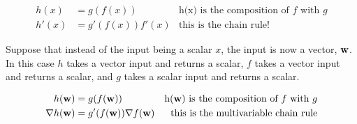 \documentclass[assignment04_Solutions]{subfiles}
\begin{document}
\begin{align}
h(x)&= g(f(x))&\mbox{h(x) is the composition of $f$ with $g$} \nonumber \\
h'(x) &= g'(f(x))f'(x)&\mbox{this is the chain rule!}
\end{align}

Suppose that instead of the input being a scalar $x$, the input is now a vector, $\mathbf{w}$.  In this case $h$ takes a vector input and returns a scalar, $f$ takes a vector input and returns a scalar, and $g$ takes a scalar input and returns a scalar.

\begin{align}
h(\mathbf{w}) &= g(f(\mathbf{w}))&\mbox{h($\mathbf{w}$) is the composition of $f$ with $g$} \nonumber \\
\nabla h(\mathbf{w}) &= g'(f(\mathbf{w})) \nabla f(\mathbf{w}) & \mbox{this is the multivariable chain rule}
\end{align}
\end{document}
